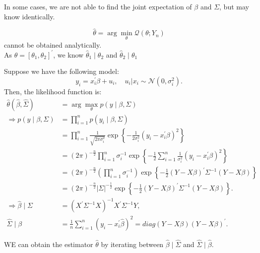 In some cases, we are not able to find the joint expectation of $\beta$ and $\Sigma$, but may know identically.

\begin{eg}
    $$\hat{\theta} = \arg \min_{\theta} \mathcal{Q}(\theta; Y_n)$$ cannot be obtained analytically.\\
    As $\theta = [\theta_1, \theta_2]^{\prime}$, we know $\hat{\theta}_1 \mid \theta_2$ and $\hat{\theta}_2 \mid \theta_1$
\end{eg}

Suppose we have the following model:
\[
y_i = x_i^{\prime} \beta + u_i, \quad u_i|x_i \sim \mathcal{N}(0, \sigma_i^2).
\]
Then, the likelihood function is:
\begin{align*}
    \hat{\theta}\left(\hat{\beta}, \hat{\Sigma}\right) &= \arg \max_{\theta} p\left(y \mid \beta, \Sigma\right) \\
    \Rightarrow p\left(y \mid \beta, \Sigma\right) &= \prod_{i=1}^{n} p\left(y_i \mid \beta, \Sigma\right) \\
    &= \prod_{i=1}^{n} \frac{1}{\sqrt{2\pi \sigma_i^2}} \exp\left\{-\frac{1}{2\sigma_i^2} \left(y_i - x_i^{\prime} \beta\right)^2\right\} \\
    &= \left(2\pi\right)^{-\frac{n}{2}} \prod_{i=1}^{n} \sigma_i^{-1} \exp\left\{-\frac{1}{2} \sum_{i=1}^{n} \frac{1}{\sigma_i^2} \left(y_i - x_i^{\prime} \beta\right)^2\right\} \\
    &= \left(2\pi\right)^{-\frac{n}{2}} \left(\prod_{i=1}^{n} \sigma_i^{-1}\right) \exp\left\{-\frac{1}{2} \left(Y - X \beta\right)^{\prime} \Sigma^{-1} \left(Y - X \beta\right)\right\}\\
    &= \left(2\pi\right)^{-\frac{n}{2}} \vert \Sigma \vert ^{-\frac{1}{2}} \exp\left\{-\frac{1}{2} \left(Y - X \beta\right)^{\prime} \Sigma^{-1} \left(Y - X \beta\right)\right\}. \\
    \Rightarrow \hat{\beta} \mid \Sigma &= \left(X^{\prime} \Sigma^{-1} X\right)^{-1}X^{\prime} \Sigma^{-1}Y,\\
    \hat{\Sigma} \mid \beta &= \frac{1}{n} \sum_{i=1}^{n} \left(y_i - x_i^{\prime} \hat{\beta}\right)^2 = diag{(Y-X \beta)(Y - X \beta)^{\prime}}.
\end{align*}

WE can obtain the estimator $\hat{\theta}$ by iterating between $\hat{\beta} \mid \hat{\Sigma}$ and $\hat{\Sigma} \mid \hat{\beta}$.

